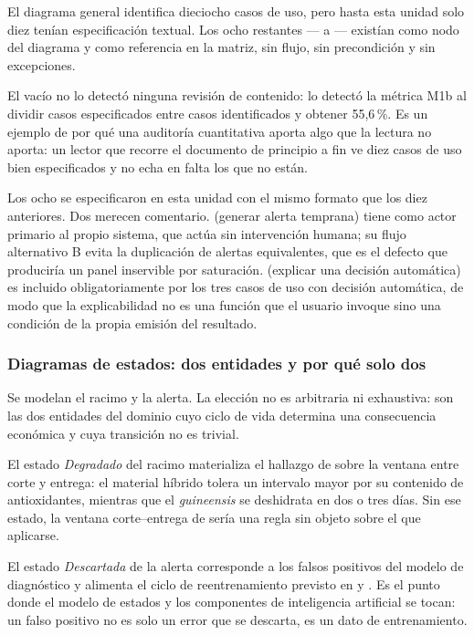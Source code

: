 El diagrama general identifica dieciocho casos de uso, pero hasta esta unidad solo diez tenían
especificación textual. Los ocho restantes --- a --- existían como nodo del
diagrama y como referencia en la matriz, sin flujo, sin precondición y sin excepciones.

El vacío no lo detectó ninguna revisión de contenido: lo detectó la métrica M1b al dividir casos
especificados entre casos identificados y obtener 55,6\,\%. Es un ejemplo de por qué una auditoría
cuantitativa aporta algo que la lectura no aporta: un lector que recorre el documento de principio a
fin ve diez casos de uso bien especificados y no echa en falta los que no están.

Los ocho se especificaron en esta unidad con el mismo formato que los diez anteriores. Dos merecen
comentario.  (generar alerta temprana) tiene como actor primario al propio sistema, que
actúa sin intervención humana; su flujo alternativo B evita la duplicación de alertas equivalentes,
que es el defecto que produciría un panel inservible por saturación.  (explicar una
decisión automática) es incluido obligatoriamente por los tres casos de uso con decisión automática,
de modo que la explicabilidad no es una función que el usuario invoque sino una condición de la
propia emisión del resultado.

\subsubsection*{Diagramas de estados: dos entidades y por qué solo dos}

Se modelan el racimo y la alerta. La elección no es arbitraria ni exhaustiva: son las dos entidades
del dominio cuyo ciclo de vida determina una consecuencia económica y cuya transición no es trivial.

El estado \emph{Degradado} del racimo materializa el hallazgo de  sobre la ventana entre
corte y entrega: el material híbrido tolera un intervalo mayor por su contenido de antioxidantes,
mientras que el \emph{guineensis} se deshidrata en dos o tres días. Sin ese estado, la ventana
corte--entrega de  sería una regla sin objeto sobre el que aplicarse.

El estado \emph{Descartada} de la alerta corresponde a los falsos positivos del modelo de diagnóstico
y alimenta el ciclo de reentrenamiento previsto en  y . Es el punto donde el
modelo de estados y los componentes de inteligencia artificial se tocan: un falso positivo no es solo
un error que se descarta, es un dato de entrenamiento.

